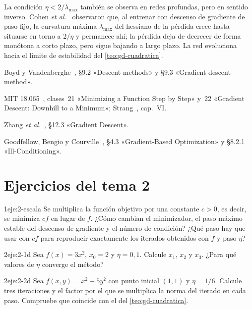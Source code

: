 \begin{observacion}\label{obs:borde}
La condición $\eta<2/\lambda_{\max}$ también se observa en redes profundas, pero en sentido inverso. Cohen \emph{et al.}~\cite{cohen} observaron que, al entrenar con descenso de gradiente de paso fijo, la curvatura máxima $\lambda_{\max}$ del hessiano de la pérdida crece hasta situarse en torno a $2/\eta$ y permanece ahí; la pérdida deja de decrecer de forma monótona a corto plazo, pero sigue bajando a largo plazo. La red evoluciona hacia el límite de estabilidad del \cref{teo:gd-cuadratica}.
\end{observacion}

\begin{lecturas}
\item Boyd y Vandenberghe~\cite{bv}, §9.2 «Descent methods» y §9.3 «Gradient descent method».
\item MIT 18.065~\cite{mit18065}, clases~21 «Minimizing a Function Step by Step» y~22 «Gradient Descent: Downhill to a Minimum»; Strang~\cite{strang}, cap.~VI.
\item Zhang \emph{et al.}~\cite{d2l}, §12.3 «Gradient Descent».
\item Goodfellow, Bengio y Courville~\cite{gbc}, §4.3 «Gradient-Based Optimization» y §8.2.1 «Ill-Conditioning».
\end{lecturas}

\section*{Ejercicios del tema 2}

\begin{ejercicio}{1}{eje:2-escala}
Se multiplica la función objetivo por una constante $c>0$, es decir, se minimiza $cf$ en lugar de $f$. ¿Cómo cambian el minimizador, el paso máximo estable del descenso de gradiente y el número de condición? ¿Qué paso hay que usar con $cf$ para reproducir exactamente los iterados obtenidos con $f$ y paso $\eta$?
\end{ejercicio}

\begin{ejercicio}{2}{eje:2-1d}
Sea $f(x)=3x^{2}$, $x_0=2$ y $\eta=0{,}1$. Calcule $x_1$, $x_2$ y $x_3$. ¿Para qué valores de $\eta$ converge el método?
\end{ejercicio}

\begin{ejercicio}{2}{eje:2-2d}
Sea $f(x,y)=x^{2}+5y^{2}$ con punto inicial $(1,1)$ y $\eta=1/6$. Calcule tres iteraciones y el factor por el que se multiplica la norma del iterado en cada paso. Compruebe que coincide con el del \cref{teo:gd-cuadratica}.
\end{ejercicio}

